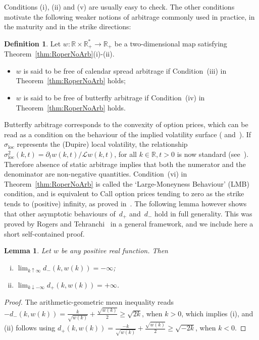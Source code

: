 \documentclass{amsart}[11pt]
\numberwithin{equation}{section}
\newtheorem{lemma}[theorem]{Lemma}
\theoremstyle{definition}
\newtheorem{definition}[theorem]{Definition}
\newcommand{\RR}{\mathbb{R}}
\newcommand{\Ll}{\mathcal{L}}
\newcommand{\loc}{\mathrm{loc}}
\begin{document}
Conditions (i),  (ii) and (v) are usually easy to check.
The other conditions motivate the following weaker notions of arbitrage commonly used in practice, in the maturity and in the strike directions:
\begin{definition}\label{def:WeakArb}
Let $w:\RR\times\RR_+^*\to\RR_+$ be a two-dimensional map satisfying Theorem~\ref{thm:RoperNoArb}(i)-(ii).
\begin{itemize}
\item $w$ is said to be free of calendar spread arbitrage if Condition~(iii) in Theorem~\ref{thm:RoperNoArb} holds;
\item $w$ is said to be free of butterfly arbitrage if Condition~(iv) in Theorem~\ref{thm:RoperNoArb} holds.
\end{itemize}
\end{definition}
Butterfly arbitrage corresponds to the convexity of option prices, 
which can be read as a condition on the behaviour of the implied volatility surface
(\cite[Definition 2.3]{gj} and~\cite[Lemma 2.2]{gj}).
If $\sigma_{\loc}$ represents the (Dupire) local volatility, the relationship
$\sigma^2_{\loc}(k,t) = \partial_t w(k,t)/\Ll w (k,t)$, for all $k\in\mathbb{R}, t>0$ is now standard (see~\cite[Chapter 1, Equation (1.10)]{jimbook}).
Therefore absence of static arbitrage implies that both the numerator and the denominator are non-negative quantities.
Condition~(vi) in Theorem~\ref{thm:RoperNoArb} is called the `Large-Moneyness Behaviour' (LMB) condition,
and is equivalent to Call option prices tending to zero as the strike tends to (positive) infinity,
as proved in~\cite[Theorem 5.3]{RT10}.
The following lemma however shows that other asymptotic behaviours of~$d_+$ and~$d_-$ 
hold in full generality.
This was proved by Rogers and Tehranchi~\cite{RT10} in a general framework, 
and we include here a short self-contained proof.

\begin{lemma}\label{lem:RT10}
Let $w$ be any positive real function. Then
\begin{enumerate}[(i)]
\item $\lim_{k\uparrow \infty} d_-(k, w(k))=-\infty$;
\item $\lim_{k\downarrow -\infty} d_+(k, w(k))=+\infty$.
\end{enumerate}
\end{lemma}
\begin{proof}
The arithmetic-geometric mean inequality reads
$-d_-(k, w(k)) =  \frac{k}{\sqrt{w(k)}}+\frac{\sqrt{w(k)}}{2}\geq \sqrt{2k}$, when $k>0$, 
which implies (i), and (ii) follows using
$d_+(k, w(k)) =  \frac{-k}{\sqrt{w(k)}}+\frac{\sqrt{w(k)}}{2}\geq \sqrt{-2k}$, when $k<0$.
\end{proof}
\end{document}
